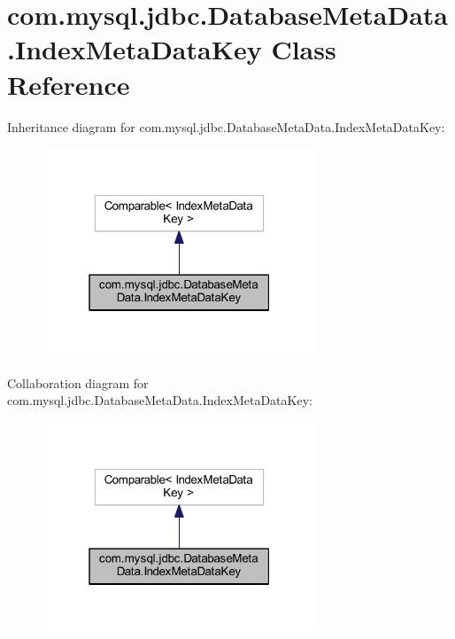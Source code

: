 \hypertarget{classcom_1_1mysql_1_1jdbc_1_1_database_meta_data_1_1_index_meta_data_key}{}\section{com.\+mysql.\+jdbc.\+Database\+Meta\+Data.\+Index\+Meta\+Data\+Key Class Reference}
\label{classcom_1_1mysql_1_1jdbc_1_1_database_meta_data_1_1_index_meta_data_key}


Inheritance diagram for com.\+mysql.\+jdbc.\+Database\+Meta\+Data.\+Index\+Meta\+Data\+Key\+:
\nopagebreak
\begin{figure}[H]
\begin{center}
\leavevmode
\includegraphics[width=232pt]{classcom_1_1mysql_1_1jdbc_1_1_database_meta_data_1_1_index_meta_data_key__inherit__graph}
\end{center}
\end{figure}


Collaboration diagram for com.\+mysql.\+jdbc.\+Database\+Meta\+Data.\+Index\+Meta\+Data\+Key\+:
\nopagebreak
\begin{figure}[H]
\begin{center}
\leavevmode
\includegraphics[width=232pt]{classcom_1_1mysql_1_1jdbc_1_1_database_meta_data_1_1_index_meta_data_key__coll__graph}
\end{center}
\end{figure}

